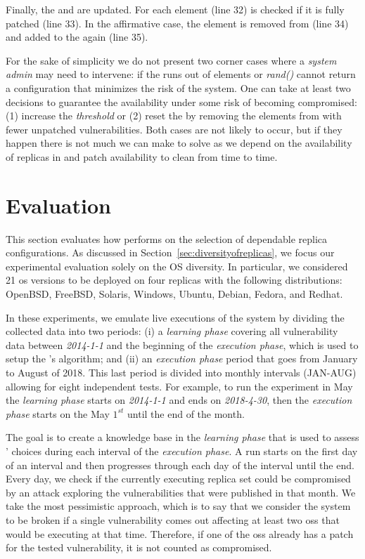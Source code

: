 Finally, the \RS and \QS are updated. 
For each \QS element (line 32) is checked if it is fully patched (line 33).
In the affirmative case, the element is removed from \QS (line 34) and added to the \RS again (line 35).


For the sake of simplicity we do not present two corner cases where a \emph{system admin} may need to intervene: if the \RS runs out of elements or \emph{rand()} cannot return a configuration that minimizes the risk of the system.
One can take at least two decisions to guarantee the availability under some risk of becoming compromised: (1) increase the \emph{threshold} or (2) reset the \RS by removing the elements from \QS with fewer unpatched vulnerabilities.
Both cases are not likely to occur, but if they happen there is not much we can make to solve as we depend on the availability of replicas in \RS and patch availability to clean \QS from time to time. 

\section{Evaluation}
\label{sec:diversity}


This section evaluates how \system performs on the selection of dependable replica configurations.
As discussed in Section~\ref{sec:diversityofreplicas}, we focus our experimental evaluation solely on the OS diversity.
In particular, we considered 21 \gls{os} versions to be deployed on four replicas with the following distributions: OpenBSD, FreeBSD, Solaris, Windows, Ubuntu, Debian, Fedora, and Redhat. 

In these experiments, we emulate live executions of the system by dividing the collected data into two periods:
(i) a \emph{learning phase} covering all vulnerability data between \emph{2014-1-1} and the beginning of the \emph{execution phase}, which is used to setup the \risk's algorithm; 
and (ii) an \emph{execution phase} period that goes from January to August of 2018. 
This last period is divided into monthly intervals (JAN-AUG) allowing for eight independent tests.
For example, to run the experiment in May the \emph{learning phase} starts on \emph{2014-1-1} and ends on \emph{2018-4-30}, then the \emph{execution phase} starts on the May $1^{st}$ until the end of the month. 

The goal is to create a knowledge base in the \emph{learning phase} that is used to assess \system' choices during each interval of the \emph{execution phase}. 
A run starts on the first day of an interval and then progresses through each day of the interval until the end. 
Every day, we check if the currently executing replica set could be compromised by an attack exploring the vulnerabilities that were published in that month. 
We take the most pessimistic approach, which is to say that we consider the system to be broken if a single vulnerability comes out affecting at least two \glspl{os} that would be executing at that time.
Therefore, if one of the \glspl{os} already has a patch for the tested vulnerability, it is not counted as compromised.


